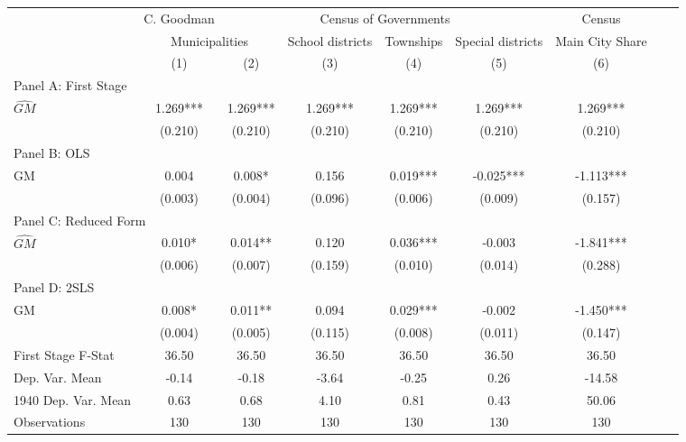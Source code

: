 \begin{tabular}{l*{8}{c}} \toprule
&\multicolumn{1}{c}{C. Goodman}&\multicolumn{4}{c}{Census of Governments}&\multicolumn{1}{c}{Census}\\\cmidrule(lr){2-2}\cmidrule(lr){3-6}\cmidrule(lr){7-7}
&\multicolumn{2}{c}{Municipalities}&\multicolumn{1}{c}{School districts}&\multicolumn{1}{c}{Townships}&\multicolumn{1}{c}{Special districts}&\multicolumn{1}{c}{Main City Share}\\\cmidrule(lr){2-3}\cmidrule(lr){4-6}\cmidrule(lr){7-7}
&\multicolumn{1}{c}{(1)}&\multicolumn{1}{c}{(2)}&\multicolumn{1}{c}{(3)}&\multicolumn{1}{c}{(4)}&\multicolumn{1}{c}{(5)}&\multicolumn{1}{c}{(6)}\\
\cmidrule(lr){1-7}
\multicolumn{6}{l}{Panel A: First Stage}\\
\cmidrule(lr){1-7}
$\widehat{GM}$  &    1.269***&    1.269***&    1.269***&    1.269***&    1.269***&    1.269***\\
                &  (0.210)   &  (0.210)   &  (0.210)   &  (0.210)   &  (0.210)   &  (0.210)   \\
\cmidrule(lr){1-7}
\multicolumn{6}{l}{Panel B: OLS}\\
\cmidrule(lr){1-7}
GM              &    0.004   &    0.008*  &    0.156   &    0.019***&   -0.025***&   -1.113***\\
                &  (0.003)   &  (0.004)   &  (0.096)   &  (0.006)   &  (0.009)   &  (0.157)   \\
\cmidrule(lr){1-7}
\multicolumn{6}{l}{Panel C: Reduced Form}\\
\cmidrule(lr){1-7}
$\widehat{GM}$  &    0.010*  &    0.014** &    0.120   &    0.036***&   -0.003   &   -1.841***\\
                &  (0.006)   &  (0.007)   &  (0.159)   &  (0.010)   &  (0.014)   &  (0.288)   \\
\cmidrule(lr){1-7}
\multicolumn{6}{l}{Panel D: 2SLS}\\
\cmidrule(lr){1-7}
GM              &    0.008*  &    0.011** &    0.094   &    0.029***&   -0.002   &   -1.450***\\
                &  (0.004)   &  (0.005)   &  (0.115)   &  (0.008)   &  (0.011)   &  (0.147)   \\
\midrule
First Stage F-Stat&    36.50   &    36.50   &    36.50   &    36.50   &    36.50   &    36.50   \\
Dep. Var. Mean  &    -0.14   &    -0.18   &    -3.64   &    -0.25   &     0.26   &   -14.58   \\
1940 Dep. Var. Mean&     0.63   &     0.68   &     4.10   &     0.81   &     0.43   &    50.06   \\
Observations    &      130   &      130   &      130   &      130   &      130   &      130   \\
       \bottomrule \end{tabular}

